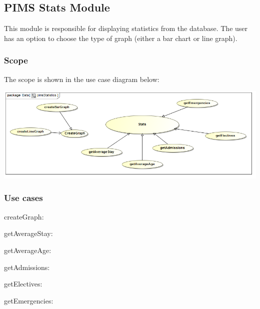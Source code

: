 \subsection{PIMS Stats Module}
This module is responsible for displaying statistics from the database. The user has an option to choose the type of graph (either a bar chart or line graph). \par 

\subsubsection{Scope}
The scope is shown in the use case diagram below: \par
\includegraphics[width=0.75\linewidth]{./Graphics/pimsStats/pimsStatistics}

\subsubsection{Use cases}
\begin{description}
	\item{createGraph:} 
	\item{getAverageStay:}
	\item{getAverageAge:}
	\item{getAdmissions:}
	\item{getElectives:}
	\item{getEmergencies:}  
\end{description}